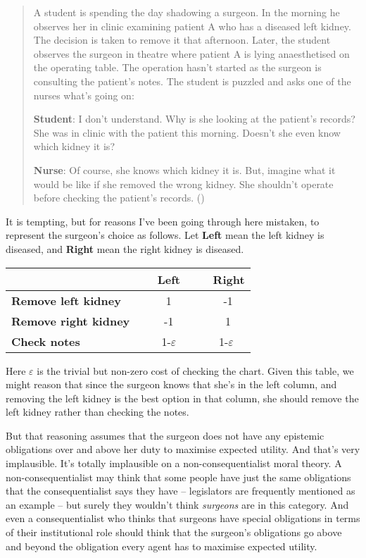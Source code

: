 \documentclass[
  11pt,
  letterpaper,
  DIV=11,
  numbers=noendperiod,
  twoside]{scrartcl}
\begin{document}
\begin{quote}
A student is spending the day shadowing a surgeon. In the morning he
observes her in clinic examining patient A who has a diseased left
kidney. The decision is taken to remove it that afternoon. Later, the
student observes the surgeon in theatre where patient A is lying
anaesthetised on the operating table. The operation hasn't started as
the surgeon is consulting the patient's notes. The student is puzzled
and asks one of the nurses what's going on:

\textbf{Student}: I don't understand. Why is she looking at the
patient's records? She was in clinic with the patient this morning.
Doesn't she even know which kidney it is?

\textbf{Nurse}: Of course, she knows which kidney it is. But, imagine
what it would be like if she removed the wrong kidney. She shouldn't
operate before checking the patient's records.
()
\end{quote}

It is tempting, but for reasons I've been going through here mistaken,
to represent the surgeon's choice as follows. Let \textbf{Left} mean the
left kidney is diseased, and \textbf{Right} mean the right kidney is
diseased.

\begin{longtable}[]{@{}lcc@{}}
\toprule\noalign{}
~ & ~ \textbf{Left} ~ & ~ \textbf{Right} \\
\midrule\noalign{}
\endhead
\bottomrule\noalign{}
\endlastfoot
\textbf{Remove left kidney} ~ & ~ 1 ~ & ~ -1 \\
\textbf{Remove right kidney}~ & ~ -1 ~ & ~ 1 \\
\textbf{Check notes} ~ & ~1-\(\varepsilon\)~ & ~1-\(\varepsilon\) \\
\end{longtable}

Here \(\varepsilon\) is the trivial but non-zero cost of checking the
chart. Given this table, we might reason that since the surgeon knows
that she's in the left column, and removing the left kidney is the best
option in that column, she should remove the left kidney rather than
checking the notes.

But that reasoning assumes that the surgeon does not have any epistemic
obligations over and above her duty to maximise expected utility. And
that's very implausible. It's totally implausible on a
non-consequentialist moral theory. A non-consequentialist may think that
some people have just the same obligations that the consequentialist
says they have -- legislators are frequently mentioned as an example --
but surely they wouldn't think \emph{surgeons} are in this category. And
even a consequentialist who thinks that surgeons have special
obligations in terms of their institutional role should think that the
surgeon's obligations go above and beyond the obligation every agent has
to maximise expected utility.
\end{document}
